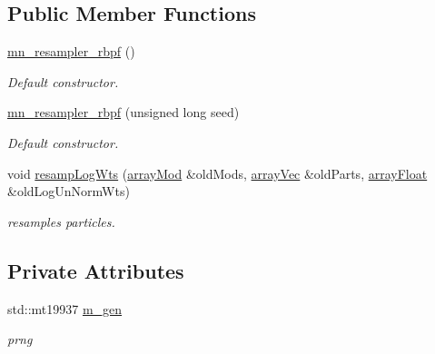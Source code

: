 \subsection*{Public Member Functions}
\begin{DoxyCompactItemize}
\item 
\mbox{\label{classmn__resampler__rbpf_acfefe5df6a03b0be01b34477b844a486}} 
\hyperlink{classmn__resampler__rbpf_acfefe5df6a03b0be01b34477b844a486}{mn\+\_\+resampler\+\_\+rbpf} ()
\begin{DoxyCompactList}\small\item\em Default constructor. \end{DoxyCompactList}\item 
\mbox{\label{classmn__resampler__rbpf_a4489e08e1dfdd3edcbf292a8cc974289}} 
\hyperlink{classmn__resampler__rbpf_a4489e08e1dfdd3edcbf292a8cc974289}{mn\+\_\+resampler\+\_\+rbpf} (unsigned long seed)
\begin{DoxyCompactList}\small\item\em Default constructor. \end{DoxyCompactList}\item 
void \hyperlink{classmn__resampler__rbpf_a1ae1ffd0262e853c601659509fa5e8ea}{resamp\+Log\+Wts} (\hyperlink{classmn__resampler__rbpf_a268fe176a23e146b8f0c1acbaf8625b3}{array\+Mod} \&old\+Mods, \hyperlink{classmn__resampler__rbpf_a9eddf10f48c19b555276bbd23826044b}{array\+Vec} \&old\+Parts, \hyperlink{classmn__resampler__rbpf_a43fa641c6d15c8ee79da47d6af02ac16}{array\+Float} \&old\+Log\+Un\+Norm\+Wts)
\begin{DoxyCompactList}\small\item\em resamples particles. \end{DoxyCompactList}\end{DoxyCompactItemize}
\subsection*{Private Attributes}
\begin{DoxyCompactItemize}
\item 
\mbox{\label{classmn__resampler__rbpf_ad4ff62e53d193d9126889a59c54a4d0e}} 
std\+::mt19937 \hyperlink{classmn__resampler__rbpf_ad4ff62e53d193d9126889a59c54a4d0e}{m\+\_\+gen}
\begin{DoxyCompactList}\small\item\em prng \end{DoxyCompactList}\end{DoxyCompactItemize}


